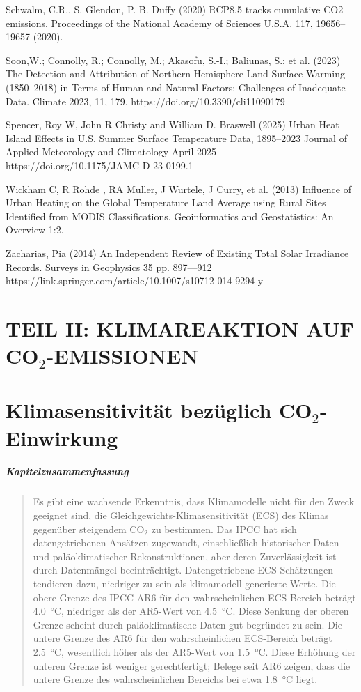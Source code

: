 \documentclass[12pt,paper=a4,DIV=12,parskip=never,chapterprefix=false,headings=standardclasses]{scrreprt}
\newcommand{\FigureNumbersByChapter}{%
  \counterwithout{figure}{section}%
  \counterwithin{figure}{chapter}%
}
\begin{document}
Schwalm, C.R., S. Glendon, P. B. Duffy (2020) RCP8.5 tracks cumulative CO2 emissions. Proceedings of
the National Academy of Sciences U.S.A. 117, 19656–19657 (2020).

Soon,W.; Connolly, R.; Connolly, M.; Akasofu, S.-I.; Baliunas, S.; et al. (2023) The Detection and
Attribution of Northern Hemisphere Land Surface Warming (1850–2018) in Terms of Human and
Natural Factors: Challenges of Inadequate Data. Climate 2023, 11, 179.
https://doi.org/10.3390/cli11090179

Spencer, Roy W, John R Christy and William D. Braswell (2025) Urban Heat Island Effects in U.S.
Summer Surface Temperature Data, 1895–2023 Journal of Applied Meteorology and Climatology
April 2025 https://doi.org/10.1175/JAMC-D-23-0199.1

Wickham C, R Rohde , RA Muller, J Wurtele, J Curry, et al. (2013) Influence of Urban Heating on the
Global Temperature Land Average using Rural Sites Identified from MODIS Classifications.
Geoinformatics and Geostatistics: An Overview 1:2.

Zacharias, Pia (2014) An Independent Review of Existing Total Solar Irradiance Records. Surveys in
Geophysics 35 pp. 897—912 https://link.springer.com/article/10.1007/s10712-014-9294-y
\endgroup

\cleardoublepage
\chapter*{TEIL II: KLIMAREAKTION AUF CO$_2$-EMISSIONEN}
\FigureNumbersByChapter
{}
\cleardoublepage
\chapter{Klimasensitivität bezüglich CO$_2$-Einwirkung}
\paragraph{Kapitelzusammenfassung}
\begin{quote}
Es gibt eine wachsende Erkenntnis, dass Klimamodelle nicht für den Zweck geeignet sind, die Gleichgewichts-Klimasensitivität (ECS) des Klimas gegenüber steigendem CO$_2$ zu bestimmen. Das IPCC hat sich datengetriebenen Ansätzen zugewandt, einschließlich historischer Daten und paläoklimatischer Rekonstruktionen, aber deren Zuverlässigkeit ist durch Datenmängel beeinträchtigt.
Datengetriebene ECS-Schätzungen tendieren dazu, niedriger zu sein als klimamodell-generierte Werte. Die obere Grenze des IPCC AR6 für den wahrscheinlichen ECS-Bereich beträgt \SI{4.0}{\celsius}, niedriger als der AR5-Wert von \SI{4.5}{\celsius}. Diese Senkung der oberen Grenze scheint durch paläoklimatische Daten gut begründet zu sein. Die untere Grenze des AR6 für den wahrscheinlichen ECS-Bereich beträgt \SI{2.5}{\celsius}, wesentlich höher als der AR5-Wert von \SI{1.5}{\celsius}. Diese Erhöhung der unteren Grenze ist weniger gerechtfertigt; Belege seit AR6 zeigen, dass die untere Grenze des wahrscheinlichen Bereichs bei etwa \SI{1.8}{\celsius} liegt.
\end{quote}
\end{document}
